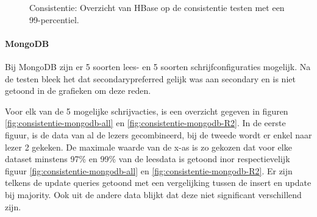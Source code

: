 \begin{figure}[ht!] 
	\centering

	\caption{Consistentie: Overzicht van HBase op de consistentie testen met een 99-percentiel.}
	\label{fig:consistentie-hbase}
\end{figure}

\paragraph{MongoDB} Bij MongoDB zijn er 5 soorten lees- en 5 soorten schrijfconfiguraties mogelijk. Na de testen bleek het dat secondarypreferred gelijk was aan secondary en is niet getoond in de grafieken om deze reden. 

Voor elk van de 5 mogelijke schrijvacties, is een overzicht gegeven in figuren \ref{fig:consistentie-mongodb-all} en \ref{fig:consistentie-mongodb-R2}. In de eerste figuur, is de data van al de lezers gecombineerd, bij de tweede wordt er enkel naar lezer 2 gekeken. De maximale waarde van de x-as is zo gekozen dat voor elke dataset minstens 97\% en 99\% van de leesdata is getoond inor respectievelijk figuur \ref{fig:consistentie-mongodb-all} en \ref{fig:consistentie-mongodb-R2}. Er zijn telkens de update queries getoond met een vergelijking tussen de insert en update bij majority. Ook uit de andere data blijkt dat deze niet significant verschillend zijn. 

